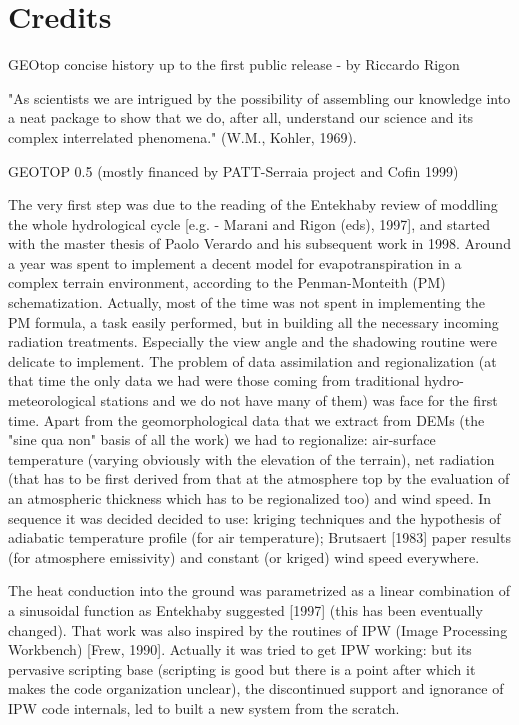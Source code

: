 \chapter{Credits}

GEOtop concise history up to the first public release - by Riccardo Rigon

 "As scientists we are intrigued by the possibility of assembling our knowledge into a neat package to show that we do, after all, understand our science and its complex interrelated phenomena." (W.M., Kohler, 1969). 

GEOTOP 0.5
(mostly financed by PATT-Serraia project and Cofin 1999)

The very first step was due to the reading of the Entekhaby review of moddling the whole hydrological cycle [e.g. - Marani and Rigon (eds), 1997], and started with  the master thesis of Paolo Verardo and his subsequent work in 1998. Around a year was spent to implement a decent model for evapotranspiration in a complex terrain environment, according to the Penman-Monteith (PM) schematization. Actually, most of the time was not spent in implementing the PM formula, a task easily performed, but in building all the necessary incoming radiation treatments.
 Especially the view angle and the shadowing routine were delicate to implement. The  problem of data assimilation and regionalization (at that time the only data we had were those coming from traditional hydro-meteorological stations and we do not have many of them) was face for the first time. 
Apart from the geomorphological data that we extract from DEMs (the "sine qua non" basis of all the work) we had to regionalize: air-surface temperature (varying obviously with the elevation of the terrain), net radiation (that has to be first derived from that at the atmosphere top by the evaluation of an atmospheric thickness which has to be regionalized too) and wind speed. 
In sequence it was decided decided to use: kriging  techniques and the hypothesis of adiabatic temperature profile (for air temperature); Brutsaert [1983] paper results (for atmosphere emissivity) and constant (or kriged) wind speed everywhere. 

The heat conduction into the ground was parametrized as a linear combination of a sinusoidal function as Entekhaby suggested [1997] (this has been eventually changed). That work  was also inspired by the routines  of IPW (Image Processing Workbench) [Frew, 1990]. 
Actually it was tried to get IPW working: but its pervasive scripting base (scripting is good but there is a point after which it makes the code organization unclear), the discontinued support and ignorance of IPW code internals, led  to built a new system from the scratch. 

